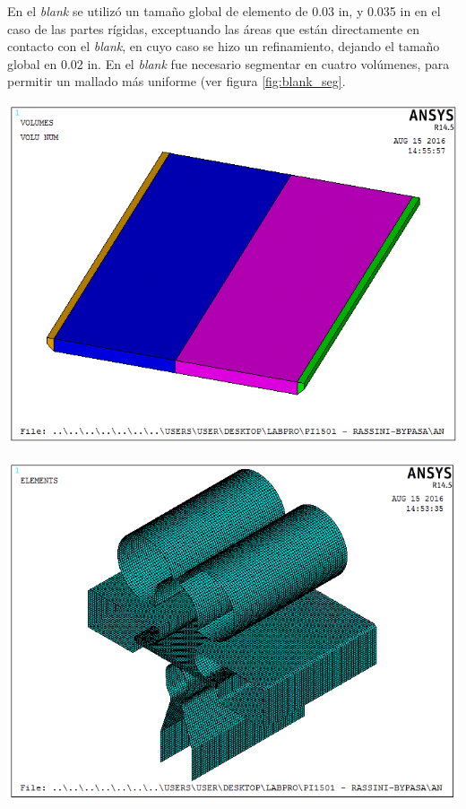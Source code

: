 En el \textit{blank} se utilizó un tamaño global de elemento de 0.03 in, y 0.035 in en el caso de las partes 
rígidas, exceptuando las áreas que están directamente en contacto con el \textit{blank}, en cuyo caso se hizo 
un refinamiento, dejando el tamaño global en 0.02 in. En el \textit{blank} fue necesario segmentar en cuatro 
volúmenes, para permitir un mallado más uniforme (ver figura \ref{fig:blank_seg}.


\begin{center}
\includegraphics[scale=0.6]{src/ch3/blank_segmentado.png}
\label{fig:blank_seg}
\end{center}



\begin{center}
\includegraphics[scale=0.6]{src/ch3/mesh_assembly_01.png}
\label{fig:mesh_assembly01}
\end{center}

